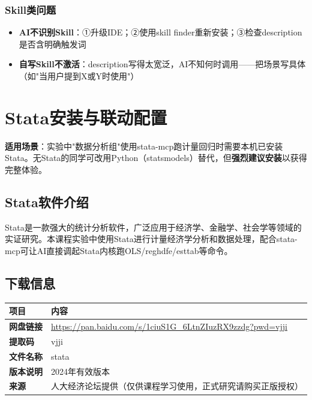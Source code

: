 \subsection{Skill类问题}

\begin{itemize}[leftmargin=2em]
  \item \textbf{AI不识别Skill}：①升级IDE；②使用skill finder重新安装；③检查description是否含明确触发词
  \item \textbf{自写Skill不激活}：description写得太宽泛，AI不知何时调用——把场景写具体（如"当用户提到X或Y时使用"）
\end{itemize}


\chapter{Stata安装与联动配置}

\textbf{适用场景}：实验中"数据分析组"使用stata-mcp跑计量回归时需要本机已安装Stata。无Stata的同学可改用Python（statsmodels）替代，但\textbf{强烈建议安装}以获得完整体验。

\section{Stata软件介绍}

Stata是一款强大的统计分析软件，广泛应用于经济学、金融学、社会学等领域的实证研究。本课程实验中使用Stata进行计量经济学分析和数据处理，配合stata-mcp可让AI直接调起Stata内核跑OLS/reghdfe/esttab等命令。

\section{下载信息}

\begin{table}[H]
\centering
\begin{tabular}{ll}
\toprule
\textbf{项目} & \textbf{内容} \\
\midrule
\textbf{网盘链接} & \url{https://pan.baidu.com/s/1ciuS1G_6LtnZIuzRX9zzdg?pwd=vjji} \\
\textbf{提取码} & vjji \\
\textbf{文件名称} & stata \\
\textbf{版本说明} & 2024年有效版本 \\
\textbf{来源} & 人大经济论坛提供（仅供课程学习使用，正式研究请购买正版授权） \\
\bottomrule
\end{tabular}
\end{table}

